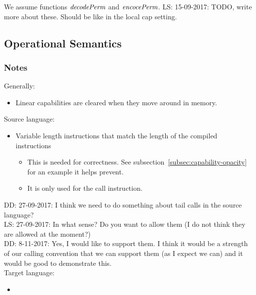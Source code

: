 \documentclass[a3paper]{article}
\newcommand\lau[1]{{\color{purple} \sf \footnotesize {LS: #1}}\\}
\newcommand\dominique[1]{{\color{purple} \sf \footnotesize {DD: #1}}\\}
\newcommand{\plainfun}[2]{
  \ifthenelse{\equal{#2}{}}
  {\mathit{#1}}
  {\mathit{#1}(#2)}
}
\newcommand{\decPerm}[1]{\plainfun{decodePerm}{#1}}
\newcommand{\encPerm}[1]{\plainfun{encocePerm}{#1}}
\begin{document}
We assume functions $\decPerm{}$ and $\encPerm{}$.
\lau{15-09-2017: TODO, write more about these. Should be like in the local cap setting.}

\subsection{Operational Semantics}
\subsubsection{Notes}
Generally:
\begin{itemize}
\item Linear capabilities are cleared when they move around in memory.
\end{itemize}

Source language:
\begin{itemize}
\item Variable length instructions that match the length of the compiled instructions
  \begin{itemize}
  \item This is needed for correctness. See subsection~\ref{subsec:capability-opacity} for an example it helps prevent.
  \item It is only used for the call instruction.
  \end{itemize}
\end{itemize}

\dominique{27-09-2017: I think we need to do something about tail calls in the source language?}
\lau{27-09-2017: In what sense? Do you want to allow them (I do not think they are allowed at the moment?)}
\dominique{8-11-2017: Yes, I would like to support them.  I think it would be a strength of our calling convention that we can support them (as I expect we can) and it would be good to demonstrate this.}

Target language:
\begin{itemize}
\item 
\end{itemize}
\end{document}
